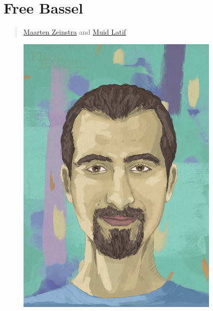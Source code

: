 \section{Free Bassel}\label{free-bassel}

\begin{quote}
\href{../appendix/attributions.html\#maarten-zeinstra}{Maarten Zeinstra}
and \href{../appendix/attributions.html\#muid-latif}{Muid Latif}
\end{quote}

\begin{figure}[htbp]
\centering
\includegraphics[width=3.85in]{../../images/ml-free-bassel-900-1.jpg}
\end{figure}
